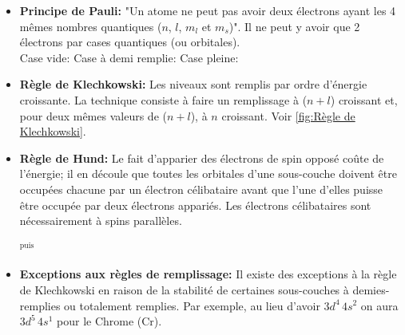 \documentclass{article}
\begin{document}
\begin{itemize}[label=$\ast$]
    \item \textbf{Principe de Pauli:} "Un atome ne peut pas avoir deux électrons ayant
    les 4 mêmes nombres quantiques ($n$, $l$, $m_l$ et $m_s$)".
    Il ne peut y avoir que 2 électrons par cases quantiques (ou orbitales).\\
    Case vide: \electron{}{\emp} \quad Case à demi remplie: \electron{}{\haut} \quad Case pleine: \electron{}{\updwn}

    \item \textbf{Règle de Klechkowski:} Les niveaux sont remplis par ordre d'énergie
    croissante. La technique consiste à faire un remplissage à ($n + l$) croissant et,
    pour deux mêmes valeurs de ($n + l$), à $n$ croissant. Voir \ref{fig:Règle de Klechkowski}.
    \item \textbf{Règle de Hund:} Le fait d'apparier des électrons de spin opposé
    coûte de l'énergie; il en découle que toutes les orbitales d'une sous-couche
    doivent être occupées chacune par un électron célibataire avant que l'une d'elles
    puisse être occupée par deux électrons appariés. Les électrons célibataires sont nécessairement à spins parallèles. 
    \begin{center}
              \hspace{3mm} {\Large $^{\text{puis}}$} \hspace{3mm}
    \end{center}
    \item \textbf{Exceptions aux règles de remplissage:} Il existe des exceptions à la
    règle de Klechkowski en raison de la stabilité de certaines sous-couches à
    demies-remplies ou totalement remplies. Par exemple, au lieu d'avoir
    $3d^4\,4s^2$ on aura $3d^5\,4s^1$ pour le Chrome (Cr).
\end{itemize}
\end{document}
